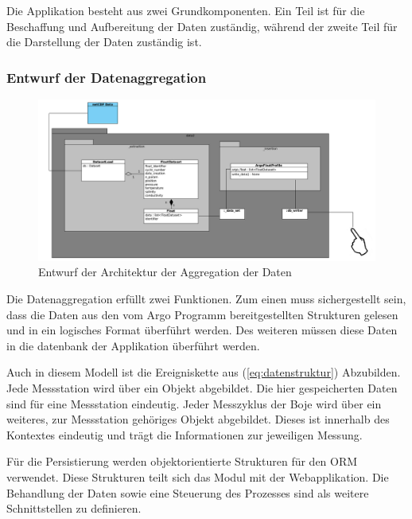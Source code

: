 

Die Applikation besteht aus zwei Grundkomponenten. Ein Teil ist für die Beschaffung und Aufbereitung der Daten zuständig, während der zweite Teil für die Darstellung der Daten zuständig ist. 

\subsubsection{Entwurf der Datenaggregation}
\begin{figure}[h!]
\centering
\includegraphics[width=\textwidth]{pix/grobentwurf_dataaggregation.png}
\caption{Entwurf der Architektur der Aggregation der Daten}
\label{fig:grobetwurf_architektur_datenaggregation}
\end{figure}

Die Datenaggregation erfüllt zwei Funktionen. Zum einen muss sichergestellt sein, dass die Daten aus den vom Argo Programm bereitgestellten Strukturen gelesen und in ein logisches Format überführt werden. Des weiteren müssen diese Daten in die datenbank der Applikation überführt werden.

Auch in diesem Modell ist die Ereigniskette aus (\ref{eq:datenstruktur}) Abzubilden. Jede Messstation wird über ein Objekt abgebildet. Die hier gespeicherten Daten sind für eine Messstation eindeutig. Jeder Messzyklus der Boje wird über ein weiteres, zur Messstation gehöriges Objekt abgebildet. Dieses ist innerhalb des Kontextes eindeutig und trägt die Informationen zur jeweiligen Messung.

Für die Persistierung  werden objektorientierte Strukturen für den ORM verwendet. Diese Strukturen teilt sich das Modul mit der Webapplikation. Die Behandlung der Daten sowie eine Steuerung des Prozesses sind als weitere Schnittstellen zu definieren. 


